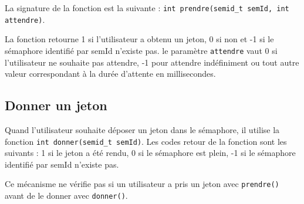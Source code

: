 La signature de la fonction est la suivante : \texttt{int prendre(semid\_t semId, int attendre)}.

La fonction retourne 1 si l'utilisateur a obtenu un jeton, 0 si non et -1 si le sémaphore identifié par semId n'existe pas. le paramètre \texttt{attendre} vaut 0 si l'utilisateur ne souhaite pas attendre, -1 pour attendre indéfiniment ou tout autre valeur correspondant à la durée d'attente en millisecondes.

\subsection{Donner un jeton}
Quand l'utilisateur souhaite déposer un jeton dans le sémaphore, il utilise la fonction \texttt{int donner(semid\_t semId)}. Les codes retour de la fonction sont les suivants : 1 si le jeton a été rendu, 0 si le sémaphore est plein, -1 si le sémaphore identifié par semId n'existe pas.

Ce mécanisme ne vérifie pas si un utilisateur a pris un jeton avec \texttt{prendre()} avant de le donner avec \texttt{donner()}.
